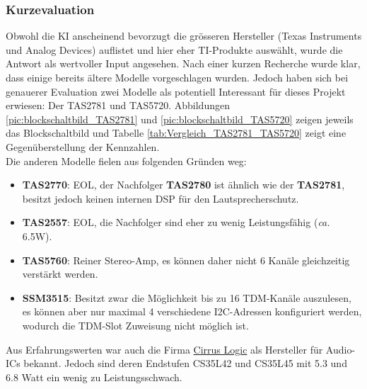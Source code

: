 \subsubsection{Kurzevaluation}Obwohl die KI anscheinend bevorzugt die grösseren Hersteller (Texas Instruments und Analog Devices) auflistet und hier eher TI-Produkte auswählt, wurde die Antwort als wertvoller Input angesehen. Nach einer kurzen Recherche wurde klar, dass einige bereits ältere Modelle vorgeschlagen wurden. Jedoch haben sich bei genauerer Evaluation zwei Modelle als potentiell Interessant für dieses Projekt erwiesen: Der TAS2781 und TAS5720. Abbildungen \ref{pic:blockschaltbild_TAS2781} und \ref{pic:blockschaltbild_TAS5720} zeigen jeweils das Blockschaltbild und Tabelle \ref{tab:Vergleich_TAS2781_TAS5720} zeigt eine Gegenüberstellung der Kennzahlen.\\
Die anderen Modelle fielen aus folgenden Gründen weg:
\begin{itemize}
	\item \textbf{TAS2770}: EOL, der Nachfolger \textbf{TAS2780} ist ähnlich wie der \textbf{TAS2781}, besitzt jedoch keinen internen DSP für den Lautsprecherschutz.
	\item \textbf{TAS2557}: EOL, die Nachfolger sind eher zu wenig Leistungsfähig (\textit{ca. }6.5W).
	\item \textbf{TAS5760}: Reiner Stereo-Amp, es können daher nicht 6 Kanäle gleichzeitig verstärkt werden.
	\item \textbf{SSM3515}: Besitzt zwar die Möglichkeit bis zu 16 TDM-Kanäle auszulesen, es können aber nur maximal 4 verschiedene I2C-Adressen konfiguriert werden, wodurch die TDM-Slot Zuweisung nicht möglich ist.
\end{itemize}
Aus Erfahrungswerten war auch die Firma \href{https://www.cirrus.com/}{Cirrus Logic} als Hersteller für Audio-ICs bekannt. Jedoch sind deren Endstufen CS35L42 und CS35L45 mit 5.3 und 6.8 Watt ein wenig zu Leistungsschwach.
